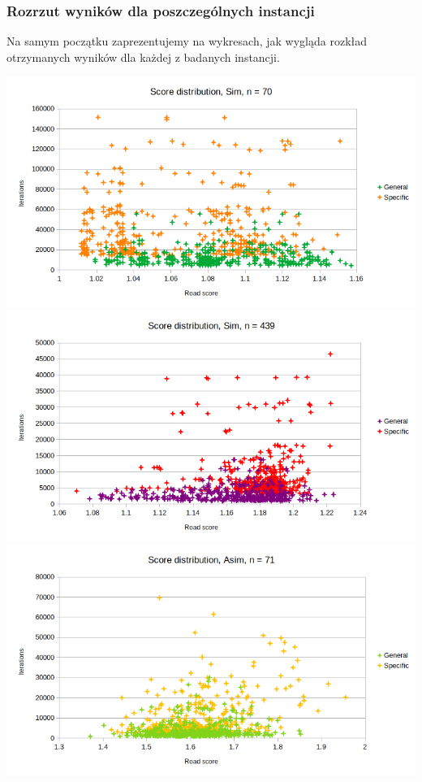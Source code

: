 \documentclass{article}
\begin{document}
\subsubsection{Rozrzut wyników dla poszczególnych instancji}
Na samym początku zaprezentujemy na wykresach, jak wygląda rozkład otrzymanych wyników dla każdej z badanych instancji.

\includegraphics[scale=0.36]{parDistSim70}
\includegraphics[scale=0.36]{parDistSim439}
\includegraphics[scale=0.36]{parDistAsim71}
\end{document}

